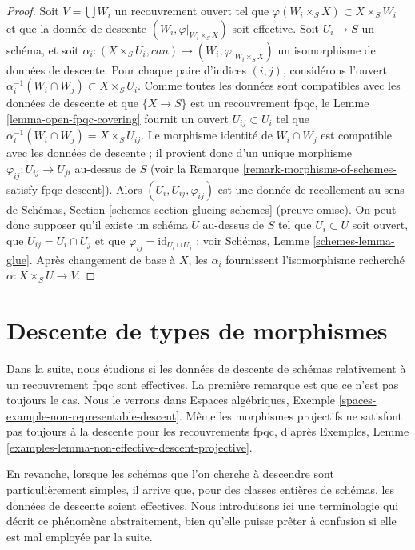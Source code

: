 \begin{proof}
Soit $V = \bigcup W_i$ un recouvrement ouvert tel que
$\varphi(W_i \times_S X) \subset X \times_S W_i$ et que la donnée de descente
$(W_i, \varphi|_{W_i \times_S X})$ soit effective. Soit $U_i \to S$ un
schéma, et soit
$\alpha_i : (X \times_S U_i, can) \to (W_i, \varphi|_{W_i \times_S X})$ un
isomorphisme de données de descente. Pour chaque paire d'indices $(i, j)$,
considérons l'ouvert
$\alpha_i^{-1}(W_i \cap W_j) \subset X \times_S U_i$. Comme toutes les
données sont compatibles avec les données de descente et que
$\{X \to S\}$ est un recouvrement fpqc, le
Lemme \ref{lemma-open-fpqc-covering} fournit un ouvert
$U_{ij} \subset U_i$ tel que
$\alpha_i^{-1}(W_i \cap W_j) = X \times_S U_{ij}$. Le morphisme identité de
$W_i \cap W_j$ est compatible avec les données de descente ; il provient donc
d'un unique morphisme $\varphi_{ij} : U_{ij} \to U_{ji}$ au-dessus de $S$
(voir la Remarque \ref{remark-morphisms-of-schemes-satisfy-fpqc-descent}).
Alors $(U_i, U_{ij}, \varphi_{ij})$ est une donnée de recollement au sens de
Schémas, Section \ref{schemes-section-glueing-schemes} (preuve omise). On peut
donc supposer qu'il existe un schéma $U$ au-dessus de $S$ tel que
$U_i \subset U$ soit ouvert, que $U_{ij} = U_i \cap U_j$ et que
$\varphi_{ij} = \text{id}_{U_i \cap U_j}$ ; voir Schémas,
Lemme \ref{schemes-lemma-glue}. Après changement de base à $X$, les
$\alpha_i$ fournissent l'isomorphisme recherché
$\alpha : X \times_S U \to V$.
\end{proof}







\section{Descente de types de morphismes}
\label{section-descending-types-morphisms}

\noindent
Dans la suite, nous étudions si les données de descente de schémas
relativement à un recouvrement fpqc sont effectives. La première remarque est
que ce n'est pas toujours le cas. Nous le verrons dans Espaces algébriques,
Exemple \ref{spaces-example-non-representable-descent}. Même les morphismes
projectifs ne satisfont pas toujours à la descente pour les recouvrements
fpqc, d'après Exemples,
Lemme \ref{examples-lemma-non-effective-descent-projective}.

\medskip\noindent
En revanche, lorsque les schémas que l'on cherche à descendre sont
particulièrement simples, il arrive que, pour des classes entières de schémas,
les données de descente soient effectives. Nous introduisons ici une
terminologie qui décrit ce phénomène abstraitement, bien qu'elle puisse prêter
à confusion si elle est mal employée par la suite.

